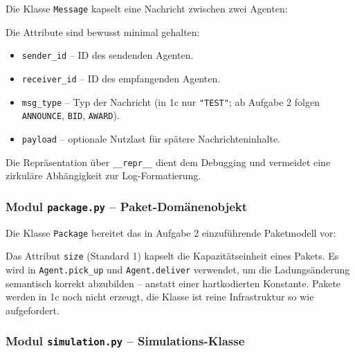 Die Klasse \texttt{Message} kapselt eine Nachricht zwischen zwei Agenten:



Die Attribute sind bewusst minimal gehalten:
\begin{itemize}
    \item \texttt{sender\_id} – ID des sendenden Agenten.
    \item \texttt{receiver\_id} – ID des empfangenden Agenten.
    \item \texttt{msg\_type} – Typ der Nachricht (in 1c nur \texttt{"TEST"}; ab Aufgabe 2 folgen \texttt{ANNOUNCE}, \texttt{BID}, \texttt{AWARD}).
    \item \texttt{payload} – optionale Nutzlast für spätere Nachrichteninhalte.
\end{itemize}

Die Repräsentation über \texttt{\_\_repr\_\_} dient dem Debugging und vermeidet eine zirkuläre Abhängigkeit zur Log-Formatierung.


\subsubsection{Modul \texttt{package.py} – Paket-Domänenobjekt}

Die Klasse \texttt{Package} bereitet das in Aufgabe 2 einzuführende Paketmodell vor:



Das Attribut \texttt{size} (Standard 1) kapselt die Kapazitätseinheit eines Pakets. Es wird in \texttt{Agent.pick\_up} und \texttt{Agent.deliver} verwendet, um die Ladungsänderung semantisch korrekt abzubilden -- anstatt einer hartkodierten Konstante. Pakete werden in 1c noch nicht erzeugt, die Klasse ist reine Infrastruktur so wie aufgefordert.


\subsubsection{Modul \texttt{simulation.py} – Simulations-Klasse}

